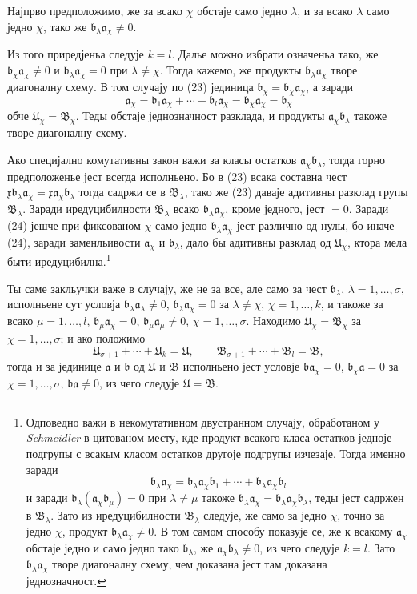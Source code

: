 ﻿\documentclass[11pt]{article}
\providecommand{\mU}{\mathfrak U}
\providecommand{\mB}{\mathfrak B}
\providecommand{\ma}{\mathfrak a}
\providecommand{\mb}{\mathfrak b}
\providecommand{\mx}{\mathfrak x}
\begin{document}
Најпрво предположимо, же за всако \(\chi\) обстаје само једно \(\lambda\), и за всако \(\lambda\) само једно \(\chi\), тако же \(\mb_\lambda\ma_\chi\ne0\).

Из того приредјеньа следује \(k=l\). Далье можно избрати означеньа тако, же \(\mb_\chi\ma_\chi\ne0\) и \(\mb_\lambda\ma_\chi=0\) при \(\lambda\ne\chi\). Тогда кажемо, же продукты \(\mb_\lambda\ma_\chi\) творе диагоналну схему. В том случају по (23) јединица \(\mb_\chi=\mb_\chi\ma_\chi\), а заради
\begin{equation}
 \ma_\chi=\mb_1\ma_\chi+\cdots+\mb_l\ma_\chi=\mb_\chi\ma_\chi=\mb_\chi
\tag{24}
\end{equation}
обче \(\mU_\chi=\mB_\chi\). Теды обстаје једнозначност разклада, и продукты \(\ma_\chi\mb_\lambda\) такоже творе диагоналну схему.

Ако специјално комутативны закон важи за класы остатков \(\ma_\chi\mb_\lambda\), тогда горно предположенье јест всегда исполньено. Бо в (23) всака составна чест \(\mx\mb_\lambda\ma_\chi=\mx\ma_\chi\mb_\lambda\) тогда садржи се в \(\mB_\lambda\), тако же (23) даваје адитивны разклад групы \(\mB_\lambda\). Заради иредуцибилности \(\mB_\lambda\) всако \(\mb_\lambda\ma_\chi\), кроме једного, јест \(=0\). Заради (24) јешче при фиксованом \(\chi\) само једно \(\mb_\lambda\ma_\chi\) јест различно од нулы, бо иначе (24), заради заменльивости \(\ma_\chi\) и \(\mb_\lambda\), дало бы адитивны разклад од \(\mU_\chi\), ктора мела быти иредуцибилна.\footnote{Одповедно важи в некомутативном двустранном случају, обработаном у \emph{Schmeidler} в цитованом месту, кде продукт всакого класа остатков једноје подгрупы с всакым класом остатков другоје подгрупы изчезаје. Тогда именно заради
\[
\mb_\lambda\ma_\chi=\mb_\lambda\ma_\chi\mb_1+\cdots+\mb_\lambda\ma_\chi\mb_l
\]
и заради \(\mb_\lambda(\ma_\chi\mb_\mu)=0\) при \(\lambda\ne\mu\) такоже \(\mb_\lambda\ma_\chi=\mb_\lambda\ma_\chi\mb_\lambda\), теды јест садржен в \(\mB_\lambda\). Зато из иредуцибилности \(\mB_\lambda\) следује, же само за једно \(\chi\), точно за једно \(\chi\), продукт \(\mb_\lambda\ma_\chi\ne0\). В том самом способу показује се, же к всакому \(\ma_\chi\) обстаје једно и само једно тако \(\mb_\lambda\), же \(\ma_\chi\mb_\lambda\ne0\), из чего следује \(k=l\). Зато \(\mb_\lambda\ma_\chi\) творе диагоналну схему, чем доказана јест там доказана једнозначност.}

Ты саме закльучки важе в случају, же не за все, але само за чест \(\mb_\lambda\), \(\lambda=1,\ldots,\sigma\), исполньене сут условја \(\mb_\lambda\ma_\lambda\ne0\), \(\mb_\lambda\ma_\chi=0\) за \(\lambda\ne\chi\), \(\chi=1,\ldots,k\), и такоже за всако \(\mu=1,\ldots,l\), \(\mb_\mu\ma_\chi=0\), \(\mb_\mu\ma_\mu\ne0\), \(\chi=1,\ldots,\sigma\). Находимо \(\mU_\chi=\mB_\chi\) за \(\chi=1,\ldots,\sigma\); и ако положимо
\[
 \mU_{\sigma+1}+\cdots+\mU_k=\mU,
 \qquad
 \mB_{\sigma+1}+\cdots+\mB_l=\mB,
\]
тогда и за јединице \(\ma\) и \(\mb\) од \(\mU\) и \(\mB\) исполньено јест условје \(\mb\ma_\chi=0\), \(\mb_\chi\ma=0\) за \(\chi=1,\ldots,\sigma\), \(\mb\ma\ne0\), из чего следује \(\mU=\mB\).
\end{document}
